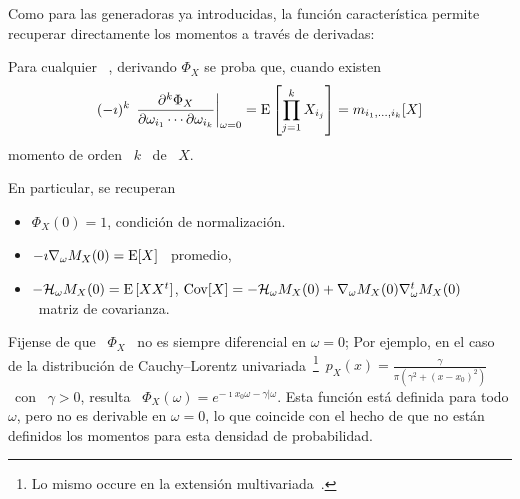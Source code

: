 Como para las generadoras ya introducidas, la funci\'on caracter\'istica permite
recuperar directamente los momentos a trav\'es de derivadas:
%
\begin{lema}
\label{Lem:MP:GeneracionMomentoViaCaracteristica}
%
  Para cualquier \  ,
  derivando $\Phi_X$ se proba que, cuando existen
  \[
  (-   \imath)^k  \,   \left.\frac{\partial^k   \Phi_X}{\partial  \omega_{i_1}
      \cdots    \partial    \omega_{i_k}}\right|_{\omega=0}    =    \operatorname{E}\left[
    \prod_{j=1}^k X_{i_j} \right] = m_{i_1,\ldots,i_k}[X]
  \]
  momento de orden \ $k$ \ de \ $X$.
\end{lema}
%
En particular, se recuperan
%
\begin{itemize}
\item $\Phi_X(0) = 1$, condici\'on de normalizaci\'on.
%
\item $- \imath \nabla_\omega M_X(0) = \operatorname{E}[X]$ \ promedio,
%
\item  $- \mathcal{H}_\omega  M_X(0) =  \operatorname{E}\left[ X  X^t \right]$,  \ie $\operatorname{Cov}[X]  = -
  \mathcal{H}_\omega M_X(0) + \nabla_\omega M_X(0) \nabla_\omega^t M_X(0)$ \ matriz de
  covarianza.
\end{itemize}

Fijense de  que \  $\Phi_X$ \  no es siempre  diferencial en  $\omega =  0$; Por
ejemplo,    en   el    caso    de   la    distribuci\'on   de    Cauchy--Lorentz
univariada~\footnote{Lo      mismo       occure      en      la      extensi\'on
  multivariada~\cite{SamTaq94}.}\ $p_X(x) =  \frac{\gamma}{\pi \left( \gamma^2 +
    (x-x_0)^2  \right)}$ \  con  \ $\gamma  >  0$, resulta  \ $\Phi_X(\omega)  =
e^{-\imath x_0  \omega -\gamma |\omega}  $. Esta funci\'on est\'a  definida para
todo $\omega$,  pero no es  derivable en  $\omega = 0$,  lo que coincide  con el
hecho  de  que  no  est\'an   definidos  los  momentos  para  esta  densidad  de
probabilidad.

